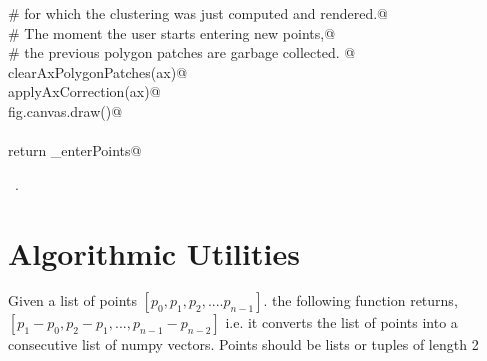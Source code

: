 \documentclass[11.5pt]{report}
\begin{document}
\begin{flushleft}
\begin{list}{}{}
\mbox{}\verb@             # for which the clustering was just computed and rendered.@\\
\mbox{}\verb@             # The moment the user starts entering new points,@\\
\mbox{}\verb@             # the previous polygon patches are garbage collected. @\\
\mbox{}\verb@             clearAxPolygonPatches(ax)@\\
\mbox{}\verb@             applyAxCorrection(ax)@\\
\mbox{}\verb@             fig.canvas.draw()@\\
\mbox{}\verb@@\\
\mbox{}\verb@    return _enterPoints@\\
\mbox{}\verb@@{\NWsep}
\end{list}
\vspace{-1.5ex}
\footnotesize
\begin{list}{}{\setlength{\itemsep}{-\parsep}\setlength{\itemindent}{-\leftmargin}}
\item \NWtxtFileDefBy\ .

\item{}
\end{list}
\vspace{4ex}
\end{flushleft}
\section{Algorithmic Utilities}

\newchunk Given a list of  points $[p_0,p_1,p_2,....p_{n-1}]$. 
    the following function returns, $[p_1-p_0, p_2-p_1,...,p_{n-1}-p_{n-2}]$
    i.e. it converts the list of points into a consecutive list of numpy vectors. 
    Points should be lists or tuples of length 2
\end{document}
